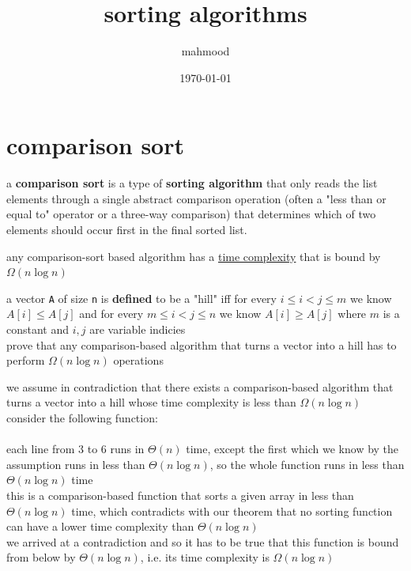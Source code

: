 \documentclass[a4paper,12pt]{article}
\author{mahmood}
\date{\today}
\title{sorting algorithms}
\begin{document}
\maketitle

\section{comparison sort}
\label{sec:org9311811}
\begin{definition}
a \textbf{comparison sort} is a type of \textbf{sorting algorithm} that only reads the list elements through a single abstract comparison operation (often a "less than or equal to" operator or a three-way comparison) that determines which of two elements should occur first in the final sorted list.\\
\begin{lemma}
any comparison-sort based algorithm has a \href{20221130014441-time_complexity.org}{time complexity} that is bound by \(\Omega(n\log n)\)\\
\end{lemma}
\begin{my_example}
a vector \texttt{A} of size \texttt{n} is \textbf{defined} to be a "hill" iff for every \(i \le i < j \le m\) we know \(A[i] \le A[j]\) and for every \(m \le i < j \le n\) we know \(A[i] \geq A[j]\) where \(m\) is a constant and \(i,j\) are variable indicies\\
prove that any comparison-based algorithm that turns a vector into a hill has to perform \(\Omega(n\log n)\) operations\\
\begin{answer}
we assume in contradiction that there exists a comparison-based algorithm that turns a vector into a hill whose time complexity is less than \(\Omega(n\log n)\)\\
consider the following function:\\
\\

each line from 3 to 6 runs in \(\Theta(n)\) time, except the first which we know by the assumption runs in less than \(\Theta(n\log n)\), so the whole function runs in less than \(\Theta(n\log n)\) time\\
this is a comparison-based function that sorts a given array in less than \(\Theta(n\log n)\) time, which contradicts with our theorem that no sorting function can have a lower time complexity than \(\Theta(n\log n)\)\\
we arrived at a contradiction and so it has to be true that this function is bound from below by \(\Theta(n\log n)\), i.e. its time complexity is \(\Omega(n\log n)\)\\
\end{answer}
\end{my_example}
\end{definition}
\end{document}
